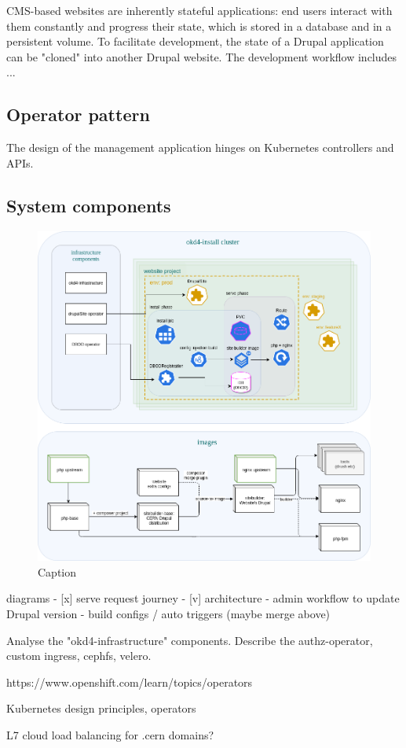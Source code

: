 CMS-based websites are inherently stateful applications: end users interact with them constantly and progress their state,
which is stored in a database and in a persistent volume.
To facilitate development, the state of a Drupal application can be "cloned" into another Drupal website.
The development workflow includes ... %

\subsection{Operator pattern}

The design of the management application hinges on Kubernetes controllers and APIs.


\subsection{System components}

\begin{figure}[ht]
    \centering
    \includegraphics[width=\textwidth]{figures/drupal-k8s-architecture}
    \caption{Caption}
    \label{fig:my_label}
\end{figure}



diagrams
- [x] serve request journey
- [v] architecture
- admin workflow to update Drupal version
- build configs / auto triggers (maybe merge above)

Analyse the "okd4-infrastructure" components.
Describe the authz-operator, custom ingress, cephfs, velero.


https://www.openshift.com/learn/topics/operators

Kubernetes design principles, operators


L7 cloud load balancing for .cern domains?